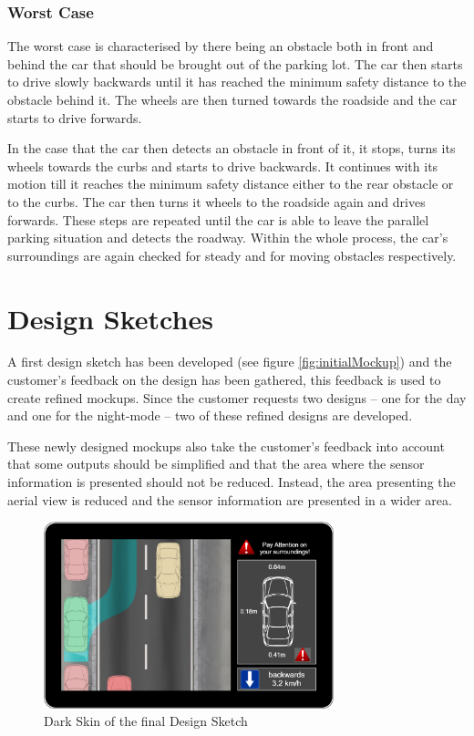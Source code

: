 \subsubsection{Worst Case}
The worst case is characterised by there being an obstacle both in front and
behind the car that should be brought out of the parking lot. The car then
starts to drive slowly backwards until it has reached the minimum safety
distance to the obstacle behind it. The wheels are then turned towards the
roadside and the car starts to drive forwards.

In the case that the car then detects an obstacle in front of it, it stops,
turns its wheels towards the curbs and starts to drive backwards. It continues
with its motion till it reaches the minimum safety distance either to the rear
obstacle or to the curbs. The car then turns it wheels to the roadside again and
drives forwards. These steps are repeated until the car is able to leave the
parallel parking situation and detects the roadway. Within the whole process,
the car's surroundings are again checked for steady and for moving obstacles
respectively.

\section{Design Sketches}

A first design sketch has been developed (see figure \ref{fig:initialMockup})
and the customer's feedback on the design has been gathered, this feedback is
used to create refined mockups. Since the customer requests two designs -- one
for the day and one for the night-mode -- two of these refined designs are
developed.

These newly designed mockups also take the customer's feedback into account that
some outputs should be simplified and that the area where the sensor information
is presented should not be reduced. Instead, the area presenting the aerial view
is reduced and the sensor information are presented in a wider area.

\begin{figure}
\centering
\captionsetup{justification=centering}
\includegraphics[width=0.75\textwidth]{res/systemAnalysis/darkskin.png}
\caption{Dark Skin of the final Design Sketch}
\label{fig:darkskin}
\end{figure}

